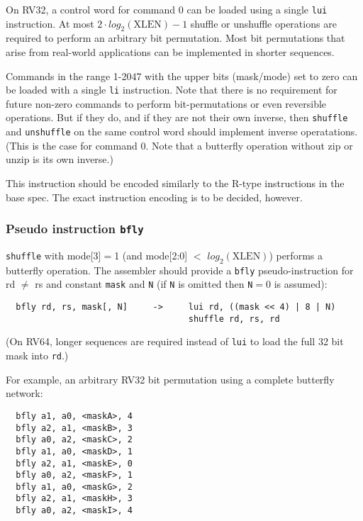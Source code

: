 On RV32, a control word for command 0 can be loaded using a single \texttt{lui} instruction.
At most $2\cdot{}log_2(\textrm{XLEN})-1$ shuffle or unshuffle operations are required to
perform an arbitrary bit permutation. Most bit permutations that arise from real-world
applications can be implemented in shorter sequences.

Commands in the range 1-2047 with the upper bits (mask/mode) set to zero can be
loaded with a single \texttt{li} instruction. Note that there is no
requirement for future non-zero commands to perform bit-permutations or even
reversible operations. But if they do, and if they are not their own inverse,
then {\tt shuffle} and {\tt unshuffle} on the same control word should
implement inverse operatations. (This is the case for command $0$. Note that a
butterfly operation without zip or unzip is its own inverse.)



This instruction should be encoded similarly to the R-type instructions in the
base spec. The exact instruction encoding is to be decided, however.

\subsubsection{Pseudo instruction {\tt bfly}}

{\tt shuffle} with mode[3]$=$1 (and mode[2:0] $<$ $log_2(\textrm{XLEN})$) performs
a butterfly operation. The assembler should provide a {\tt bfly} pseudo-instruction
for rd $\neq$ rs and constant {\tt mask} and {\tt N} (if {\tt N} is omitted then
{\tt N}$=$0 is assumed):

\begin{verbatim}
  bfly rd, rs, mask[, N]     ->     lui rd, ((mask << 4) | 8 | N)
                                    shuffle rd, rs, rd
\end{verbatim}

(On RV64, longer sequences are required instead of {\tt lui} to load the full
32 bit mask into {\tt rd}.)

For example, an arbitrary RV32 bit permutation using a complete butterfly network:

\begin{verbatim}
  bfly a1, a0, <maskA>, 4
  bfly a2, a1, <maskB>, 3
  bfly a0, a2, <maskC>, 2
  bfly a1, a0, <maskD>, 1
  bfly a2, a1, <maskE>, 0
  bfly a0, a2, <maskF>, 1
  bfly a1, a0, <maskG>, 2
  bfly a2, a1, <maskH>, 3
  bfly a0, a2, <maskI>, 4
\end{verbatim}

